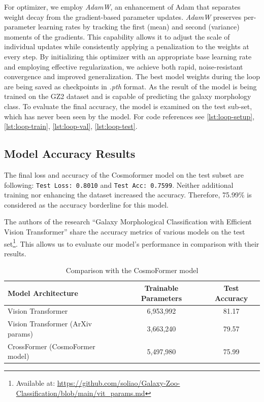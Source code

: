 For optimizer, we employ \textit{AdamW}, an enhancement of Adam that separates weight decay from the gradient-based parameter updates. \textit{AdamW} preserves per-parameter learning rates by tracking the first (mean) and second (variance) moments of the gradients. This capability allows it to adjust the scale of individual updates while consistently applying a penalization to the weights at every step. By initializing this optimizer with an appropriate base learning rate and employing effective regularization, we achieve both rapid, noise-resistant convergence and improved generalization. The best model weights during the loop are being saved as checkpoints in \textit{.pth} format. As the result of the model is being trained on the GZ2 dataset and is capable of predicting the galaxy morphology class. To evaluate the final accuracy, the model is examined on the test sub-set, which has never been seen by the model. For code references see \autoref{lst:loop-setup}, \autoref{lst:loop-train}, \autoref{lst:loop-val}, \autoref{lst:loop-test}.

\subsection*{Model Accuracy Results}
\label{sec:model-results}

The final loss and accuracy of the Cosmoformer model on the test subset are following: \texttt{Test Loss: 0.8010} and \texttt{Test Acc: 0.7599}. Neither additional training nor enhancing the dataset increased the accuracy. Therefore, 75.99\% is considered as the accuracy borderline  for this model.

The authors of the research \enquote{Galaxy Morphological Classification with Efficient Vision Transformer} \cite{lin2022galaxymorphologicalclassificationefficient} share the accuracy metrics of various models on the test set\footnote{Available at: \url{https://github.com/soliao/Galaxy-Zoo-Classification/blob/main/vit_params.md}}. This allows us to evaluate our model's performance in comparison with their results.

\begin{table}[hbt]
\centering
\caption{Comparison with the CosmoFormer model}
\label{models-compare-trained}
\begin{tabular}{|l|c|c|}
\hline
Model Architecture & Trainable Parameters & Test Accuracy \\ \hline
Vision Transformer & 6,953,992	 & 81.17 \\ \hline
Vision Transformer (ArXiv params) & 3,663,240 & 79.57 \\ \hline
CrossFormer (CosmoFormer model) & 5,497,980 & 75.99 \\ \hline
\end{tabular}
\end{table}

